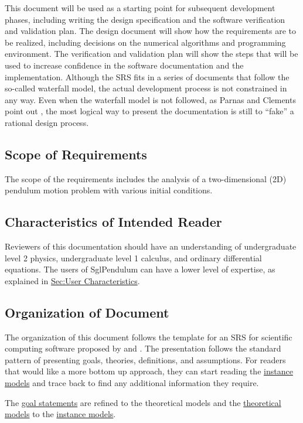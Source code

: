 \documentclass[12pt]{article}
\begin{document}
This document will be used as a starting point for subsequent development phases, including writing the design specification and the software verification and validation plan. The design document will show how the requirements are to be realized, including decisions on the numerical algorithms and programming environment. The verification and validation plan will show the steps that will be used to increase confidence in the software documentation and the implementation. Although the SRS fits in a series of documents that follow the so-called waterfall model, the actual development process is not constrained in any way. Even when the waterfall model is not followed, as Parnas and Clements point out \cite{parnasClements1986}, the most logical way to present the documentation is still to ``fake'' a rational design process.

\subsection{Scope of Requirements}
\label{Sec:ReqsScope}
The scope of the requirements includes the analysis of a two-dimensional (2D) pendulum motion problem with various initial conditions.

\subsection{Characteristics of Intended Reader}
\label{Sec:ReaderChars}
Reviewers of this documentation should have an understanding of undergraduate level 2 physics, undergraduate level 1 calculus, and ordinary differential equations. The users of SglPendulum can have a lower level of expertise, as explained in \hyperref[Sec:UserChars]{Sec:User Characteristics}.

\subsection{Organization of Document}
\label{Sec:DocOrg}
The organization of this document follows the template for an SRS for scientific computing software proposed by \cite{koothoor2013} and \cite{smithLai2005}. The presentation follows the standard pattern of presenting goals, theories, definitions, and assumptions. For readers that would like a more bottom up approach, they can start reading the \hyperref[Sec:IMs]{instance models} and trace back to find any additional information they require.

The \hyperref[Sec:GoalStmt]{goal statements} are refined to the theoretical models and the \hyperref[Sec:TMs]{theoretical models} to the \hyperref[Sec:IMs]{instance models}.
\end{document}
